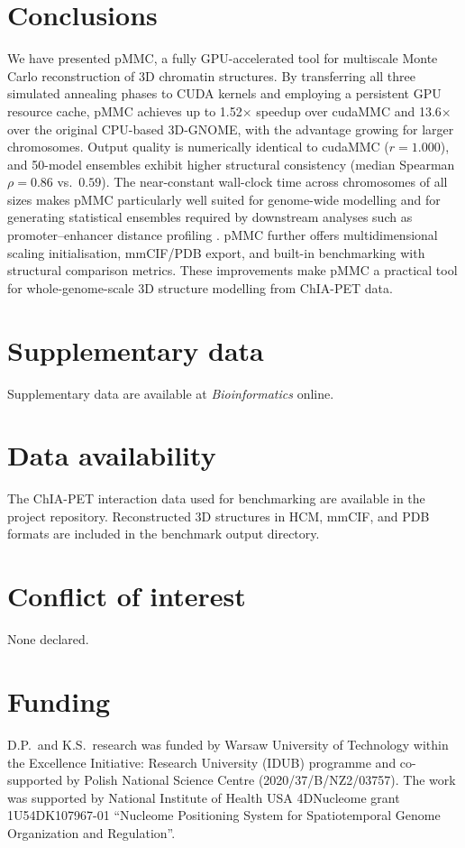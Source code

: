 \documentclass[webpdf,traditional,large]{oup-authoring-template}%
\begin{document}
\section{Conclusions}

We have presented pMMC, a fully GPU-accelerated tool for multiscale Monte Carlo reconstruction of 3D chromatin structures. By transferring all three simulated annealing phases to CUDA kernels and employing a persistent GPU resource cache, pMMC achieves up to 1.52$\times$ speedup over cudaMMC and 13.6$\times$ over the original CPU-based 3D-GNOME, with the advantage growing for larger chromosomes. Output quality is numerically identical to cudaMMC ($r = 1.000$), and 50-model ensembles exhibit higher structural consistency (median Spearman $\rho = 0.86$ vs.\ $0.59$). The near-constant wall-clock time across chromosomes of all sizes makes pMMC particularly well suited for genome-wide modelling and for generating statistical ensembles required by downstream analyses such as promoter--enhancer distance profiling \citep{Wlasnowolski2023gnome}. pMMC further offers multidimensional scaling initialisation, mmCIF/PDB export, and built-in benchmarking with structural comparison metrics. These improvements make pMMC a practical tool for whole-genome-scale 3D structure modelling from ChIA-PET data.


\section*{Supplementary data}
Supplementary data are available at \textit{Bioinformatics} online.

\section*{Data availability}
The ChIA-PET interaction data used for benchmarking are
available in the project repository. Reconstructed 3D structures
in HCM, mmCIF, and PDB formats are included in the benchmark
output directory.

\section*{Conflict of interest}
None declared.

\section*{Funding}
D.P.\ and K.S.\ research was funded by Warsaw University of Technology within the Excellence Initiative: Research University (IDUB) programme and co-supported by Polish National Science Centre (2020/37/B/NZ2/03757). The work was supported by National Institute of Health USA 4DNucleome grant 1U54DK107967-01 ``Nucleome Positioning System for Spatiotemporal Genome Organization and Regulation''.
\end{document}

